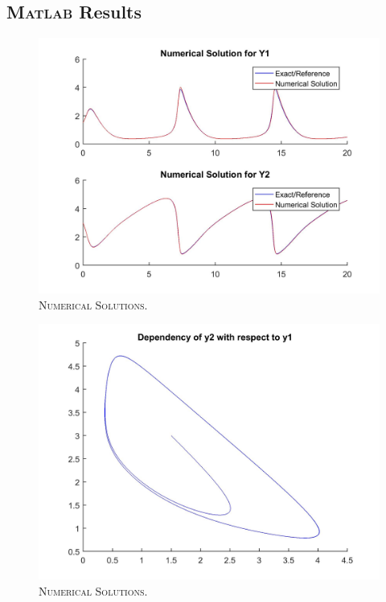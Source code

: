 \documentclass[a4paper,oneside]{book}
\numberwithin{equation}{chapter}
\begin{document}
\subsection{\textsc{Matlab} Results}
\begin{figure}[H]
\centering
\includegraphics[scale=0.18]{imp1}
\caption{\textsc{Numerical Solutions.}}
\end{figure}
\begin{figure}[H]
\centering
\includegraphics[scale=0.18]{imp2}
\caption{\textsc{Numerical Solutions.}}
\end{figure}
\end{document}
